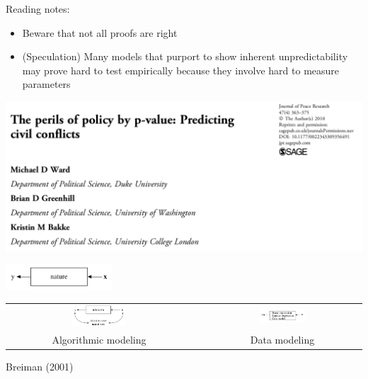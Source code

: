 \documentclass[aspectratio=169]{beamer}
\begin{document}
\begin{frame}

Reading notes:
\begin{itemize}
\item Beware that not all proofs are right
\pause
\item (Speculation) Many models that purport to show inherent unpredictability may prove hard to test empirically because they involve hard to measure parameters
\end{itemize}

\end{frame}
\begin{frame}

\begin{center}
\includegraphics[height=0.7\textheight]{figures/ward_perils_2010_title}
\end{center}

\end{frame}
\begin{frame}

\begin{center}
\includegraphics[width=0.30\textwidth]{figures/breiman_nature}
\end{center}

\pause

\begin{center}
\begin{tabular}{ccc}
\includegraphics[width=0.30\textwidth]{figures/breiman_algorithmic_modeling} & & \includegraphics[width=0.30\textwidth]{figures/breiman_data_modeling} \\
\LARGE{Algorithmic modeling} &  & \LARGE{Data modeling}
\end{tabular}
\end{center}

\vfill
Breiman (2001)

\end{frame}
\end{document}
